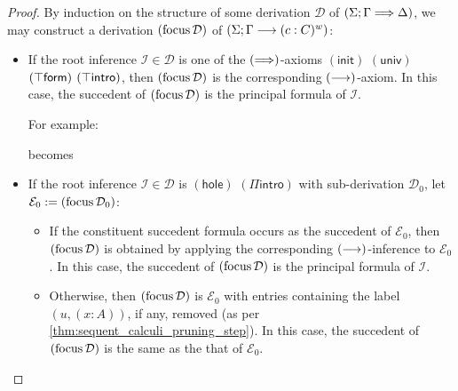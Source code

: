 \documentclass[twoside]{report}
\begin{document}
\begin{proof}
By induction on the structure of some derivation $\mathcal D$ of $(\Sigma; \Gamma \vdashs \Delta)$, we may construct a derivation $(\focus \mathcal D)$ of $(\Sigma; \Gamma \vdashf (c : C)^w)$:
\begin{itemize}
    \item If the root inference $\mathcal I \in \mathcal D$ is one of the $(\vdashs)$-axioms $(\mathsf{init})$ $(\mathsf{univ})$ $(\unit\mathsf{form})$ $(\unit\mathsf{intro})$, then $(\focus \mathcal D)$ is the corresponding $(\vdashf)$-axiom. In this case, the succedent of $(\focus \mathcal D)$ is the principal formula of $\mathcal I$.

    For example:
    \begin{prooftree}
    \end{prooftree}
    becomes
    \begin{prooftree}
    \end{prooftree}

    \item If the root inference $\mathcal I \in \mathcal D$ is $(\mathsf{hole})$ $(\Pi\mathsf{intro})$ with sub-derivation $\mathcal D_0$, let $\mathcal E_0 \defeq (\focus \mathcal D_0)$:
    \begin{itemize}
        \item If the constituent succedent formula occurs as the succedent of $\mathcal E_0$, then $(\focus \mathcal D)$ is obtained by applying the corresponding $(\vdashf)$-inference to $\mathcal E_0$. In this case, the succedent of $(\focus \mathcal D)$ is the principal formula of $\mathcal I$.

        \item Otherwise, then $(\focus \mathcal D)$ is $\mathcal E_0$ with entries containing the label $(u, (x : A))$, if any, removed (as per \cref{thm:sequent_calculi_pruning_step}). In this case, the succedent of $(\focus \mathcal D)$ is the same as the that of $\mathcal E_0$.
    \end{itemize}


\end{itemize}
\end{proof}
\end{document}
